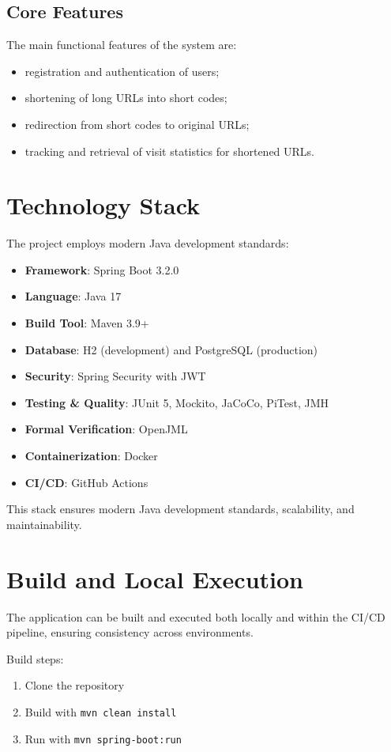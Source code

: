 \documentclass[sigconf]{acmart}
\begin{document}
\subsection{Core Features}
The main functional features of the system are:
\begin{itemize}
  \item registration and authentication of users;
  \item shortening of long URLs into short codes;
  \item redirection from short codes to original URLs;
  \item tracking and retrieval of visit statistics for shortened URLs.
\end{itemize}

\section{Technology Stack}
The project employs modern Java development standards:
\begin{itemize}
  \item \textbf{Framework}: Spring Boot 3.2.0
  \item \textbf{Language}: Java 17
  \item \textbf{Build Tool}: Maven 3.9+
  \item \textbf{Database}: H2 (development) and PostgreSQL (production)
  \item \textbf{Security}: Spring Security with JWT
  \item \textbf{Testing \& Quality}: JUnit 5, Mockito, JaCoCo, PiTest, JMH
  \item \textbf{Formal Verification}: OpenJML
  \item \textbf{Containerization}: Docker
  \item \textbf{CI/CD}: GitHub Actions
\end{itemize}

This stack ensures modern Java development standards, scalability, and maintainability.

\section{Build and Local Execution}
The application can be built and executed both locally and within the CI/CD pipeline, ensuring consistency across environments.

Build steps:
\begin{enumerate}
  \item Clone the repository
  \item Build with \texttt{mvn clean install}
  \item Run with \texttt{mvn spring-boot:run}
\end{enumerate}
\end{document}

